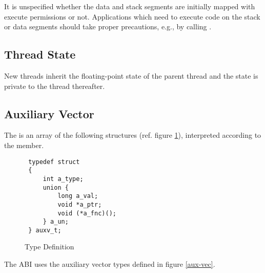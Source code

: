 It is unspecified whether 
the data and stack segments are initially mapped with
execute permissions or not.
Applications which need to execute code on the stack or data
segments should take proper precautions, e.g., by calling
.

\subsection{Thread State}

New threads inherit the floating-point state of the parent thread
and the state is private to the thread thereafter.

\subsection{Auxiliary Vector}

The  is an array of the following structures
(ref. figure \ref{fig_auxv_t}),
interpreted according to the  member.

\begin{figure}[H]
\Hrule
\caption{ Type Definition}
\label{fig_auxv_t}
\begin{center}
\begin{verbatim}
 typedef struct
 {
     int a_type;
     union {
         long a_val;
         void *a_ptr;
         void (*a_fnc)();
     } a_un;
 } auxv_t;
\end{verbatim}
\end{center}
\Hrule
\end{figure}

The \xARCH ABI uses the auxiliary vector types defined in figure \ref{aux-vec}.

